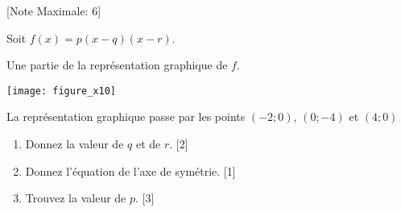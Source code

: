 \begin{question}
  \hspace*{\fill} [Note Maximale: 6]\par
  \noindent Soit $f(x)=p(x-q)(x-r)$.\par
  \medskip
  \begin{center} %
    \noindent Une partie de la représentation graphique de $f$.\par
    \texttt{[image: figure\_x10]}\par
    \noindent La représentation graphique passe par les points $(-2; 0)$, $(0; -4)$ et $(4 ; 0)$\par
  \end{center} %

  \begin{enumerate}[label=(\alph*)]
    \item Donnez la valeur de $q$ et de $r$.\hspace*{\fill} [2]
    \item Donnez l'équation de l'axe de symétrie.\hspace*{\fill} [1]
    \item Trouvez la valeur de $p$.\hspace*{\fill} [3]
  \end{enumerate}
\end{question}
